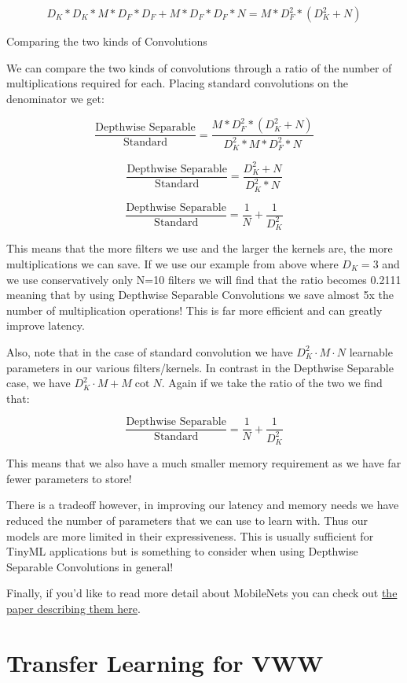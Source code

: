 $$D_K*D_K*M*D_F*D_F+M*D_F*D_F*N = M*D_F^2*(D_K^2+N)$$

Comparing the two kinds of Convolutions

We can compare the two kinds of convolutions through a ratio of the number of multiplications required for each. Placing standard convolutions on the denominator we get:

$$\frac{\text{Depthwise Separable}}{\text{Standard}} = \frac{M*D_F^2*(D_K^2+N)}{D_K^2*M*D_F^2*N}$$

$$\frac{\text{Depthwise Separable}}{\text{Standard}} = \frac{D_K^2+N}{D_K^2*N}$$

$$\frac{\text{Depthwise Separable}}{\text{Standard}} = \frac{1}{N} + \frac{1}{D_K^2}$$

This means that the more filters we use and the larger the kernels are, the more multiplications we can save. If we use our example from above where $D_K=3$ and we use conservatively only N=10 filters we will find that the ratio becomes 0.2111 meaning that by using Depthwise Separable Convolutions we save almost 5x the number of multiplication operations! This is far more efficient and can greatly improve latency.

Also, note that in the case of standard convolution we have $D_K^2 \cdot M \cdot N$  learnable parameters in our various filters/kernels. In contrast in the Depthwise Separable case, we have $D_K^2 \cdot M + M \cot N$. Again if we take the ratio of the two we find that:

$$\frac{\text{Depthwise Separable}}{\text{Standard}} = \frac{1}{N} + \frac{1}{D_K^2}$$

This means that we also have a much smaller memory requirement as we have far fewer parameters to store!

There is a tradeoff however, in improving our latency and memory needs we have reduced the number of parameters that we can use to learn with. Thus our models are more limited in their expressiveness. This is usually sufficient for TinyML applications but is something to consider when using Depthwise Separable Convolutions in general!

Finally, if you’d like to read more detail about MobileNets you can check out \href{https://arxiv.org/pdf/1704.04861.pdf}{the paper describing them here}.

\section{Transfer Learning for VWW}

